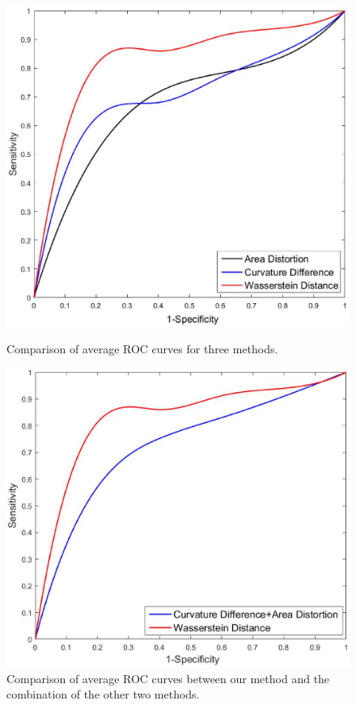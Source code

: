 \documentclass[runningheads]{llncs}
\begin{document}
\begin{figure}[!t]
\begin{minipage}[!t]{0.44\textwidth}
\includegraphics[width=\textwidth]{figs/ROC1.eps}
\caption{Comparison of average ROC curves for three methods.}\vspace{3em}
\label{fig:ROC1}
\end{minipage}%
\hspace{.3in}
\begin{minipage}[!t]{0.47\textwidth}
\includegraphics[width=\textwidth]{figs/ROC2.eps}
\caption{Comparison of average ROC curves between our method and the combination of the other two methods.}
\label{fig:ROC2}
\end{minipage}
\end{figure}
\end{document}
